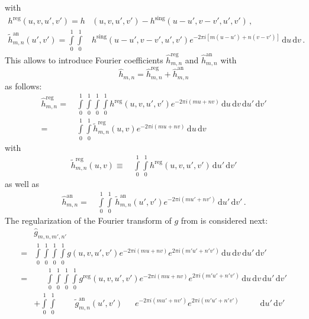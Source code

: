 with
\begin{align}
  h^\mathrm{reg} (u,v,u',v')
  = h&(u,v,u',v') - h^\mathrm{sing} (u-u',v-v',u',v') \, , \\
  \tilde{h}^\mathrm{an}_{m,n} (u',v')
  = \int\limits_0^1 \int\limits_0^1&
      h^\mathrm{sing} (u-u',v-v',u',v') e^{-2 \pi i \left[m (u-u') + n (v-v')\right]}
    \,\mathrm{d}u \,\mathrm{d}v \, . \label{eqn:singular_ft_h}
\end{align}
This allows to introduce Fourier coefficients
$\hat{h}^\textrm{reg}_{m,n}$ and $\hat{h}^\textrm{an}_{m,n}$ with
\begin{equation}
 \hat{h}_{m,n} = \hat{h}^\textrm{reg}_{m,n} + \hat{h}^\textrm{an}_{m,n}
\end{equation}
as follows:
\begin{align}
 \hat{h}^\textrm{reg}_{m,n}
 =&\, \int\limits_0^1 \int\limits_0^1 \int\limits_0^1 \int\limits_0^1
        h^\textrm{reg} (u,v,u',v') e^{-2 \pi i (m u + n v)}
        \,\mathrm{d}u \,\mathrm{d}v \,\mathrm{d}u' \,\mathrm{d}v' \label{eqn:reg_ft_h} \\
 =&\, \int\limits_0^1 \int\limits_0^1
        \tilde{h}^\textrm{reg}_{m,n}(u,v) e^{-2 \pi i (m u + n v)}
        \,\mathrm{d}u \,\mathrm{d}v \label{eqn:ft_h_reg}
\end{align}
with
\begin{align}
 \tilde{h}^\textrm{reg}_{m,n}(u,v)
 \equiv&\, \int\limits_0^1 \int\limits_0^1
             h^\textrm{reg} (u,v,u',v')
             \,\mathrm{d}u' \,\mathrm{d}v'
\end{align}
as well as
\begin{align}
 \hat{h}^\textrm{an}_{m,n}
 =&\, \int\limits_0^1 \int\limits_0^1
                   \,\tilde{h}^\mathrm{an}_{m,n} (u',v') e^{-2 \pi i (m u' + n v')}
                 \,\mathrm{d}u' \,\mathrm{d}v' \, . \label{eqn:ft_h_an}
\end{align}
%
The regularization of the Fourier transform of $g$ from  is considered next:
\begin{align}
  ~& \hat{g}_{m,n,m',n'} \nonumber \\
  =& \int\limits_0^1 \int\limits_0^1 \int\limits_0^1 \int\limits_0^1
       g(u,v,u',v') e^{-2 \pi i (m u + n v)} e^{2 \pi i (m' u' + n' v')}
     \,\mathrm{d}u \,\mathrm{d}v \,\mathrm{d}u' \,\mathrm{d}v' \nonumber \\
  =& \phantom{+}~\int\limits_0^1 \int\limits_0^1 \int\limits_0^1 \int\limits_0^1
                   g^\mathrm{reg}(u,v,u',v') e^{-2 \pi i (m u + n v)} e^{2 \pi i (m' u' + n' v')}
                 \,\mathrm{d}u \,\mathrm{d}v \,\mathrm{d}u' \,\mathrm{d}v' \\
  ~&          +  \int\limits_0^1 \int\limits_0^1 \phantom{\int\limits_0^1 \int\limits_0^1}
                   \,\tilde{g}^\mathrm{an}_{m,n} (u',v') \phantom{u,v} e^{-2 \pi i (m u' + n v')} e^{2 \pi i (m' u' + n' v')}
                 \phantom{\mathrm{d}u \,\mathrm{d}v} \,\mathrm{d}u' \,\mathrm{d}v'
\end{align}
